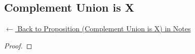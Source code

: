 
\subsection*{Complement Union is X}
\label{prf:complement-union}

\begin{remark*}[Return]
\hyperref[prop:complement-union]{$\leftarrow$ Back to Proposition (Complement Union is X) in Notes}
\end{remark*}

\begin{proof}
\end{proof}

\begin{remark*}

\end{remark*}

\begin{remark*}[Dependencies]

\FlashUses{}
\end{remark*}
